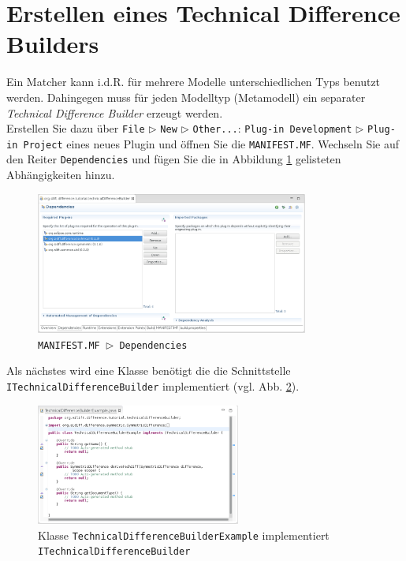 \section{Erstellen eines Technical Difference Builders}\label{sec:TechnicalDifferenceBuilder}

Ein Matcher kann i.d.R. für mehrere Modelle unterschiedlichen Typs benutzt werden. Dahingegen muss für jeden Modelltyp (Metamodell) ein separater \textit{Technical Difference Builder} erzeugt werden.\\
Erstellen Sie dazu über \texttt{File} $\triangleright$ \texttt{New} $\triangleright$ \texttt{Other...}: \texttt{Plug-in Development} $\triangleright$ \texttt{Plug-in Project} eines neues Plugin und öffnen Sie die \texttt{MANIFEST.MF}.
Wechseln Sie auf den Reiter \texttt{Dependencies} und fügen Sie die in Abbildung \ref{silift-plugin_techbuilder_manifest_dependencies} gelisteten Abhängigkeiten hinzu.

\begin{figure}[H]
\centering
\includegraphics[width=0.8\textwidth]{techbuilder/graphics/silift-plugin_techbuilder_manifest_dependencies.png}
\caption{\texttt{\texttt{MANIFEST.MF} $\triangleright$ \texttt{Dependencies}}}
\label{silift-plugin_techbuilder_manifest_dependencies}
\end{figure}

Als nächstes wird eine Klasse benötigt die die Schnittstelle \texttt{ITechnicalDifferenceBuilder} implementiert (vgl. Abb. \ref{silift-plugin_techbuilder_itechbuilder}).

\begin{figure}[H]
\centering
\includegraphics[width=0.6\textwidth]{techbuilder/graphics/silift-plugin_techbuilder_itechbuilder.png}
\caption{Klasse \texttt{TechnicalDifferenceBuilderExample} implementiert \texttt{ITechnicalDifferenceBuilder}}
\label{silift-plugin_techbuilder_itechbuilder}
\end{figure}

